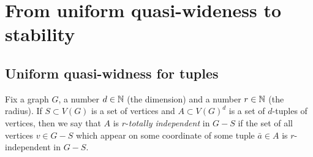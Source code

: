 
\section{From uniform quasi-wideness to stability}\label{sec:stable}

\subsection{Uniform quasi-widness for tuples}
Fix a graph $G$, a number $d\in\mathbb{N}$ (the dimension) and a number $r\in \mathbb{N}$ (the radius).
If $S\subset V(G)$ is a set of vertices and $A\subset V(G)^d$ is a set of $d$-tuples of vertices,
then we say that $A$ is $r$-\emph{totally independent} in $G-S$ 
if the set of all vertices $v\in G-S$ which appear on some coordinate of some tuple $\bar a\in A$
is $r$-independent in $G-S$. 


